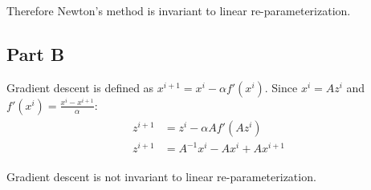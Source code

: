 \documentclass[11pt]{article}
\begin{document}
Therefore Newton's method is invariant to linear re-parameterization. 

\subsection*{Part B}
Gradient descent is defined as $x^{i+1}=x^{i}-\alpha f'(x^{i})$. Since $x^{i}=Az^{i}$ and 
$f'(x^{i})=\frac{x^{i}-x^{i+1}}{\alpha}$:
\begin{align}
	\begin{split}
		z^{i+1} &= z^{i}-\alpha Af'(Az^{i}) \\
		z^{i+1} &= A^{-1}x^{i} - Ax^{i} + Ax^{i+1}
	\end{split}
\end{align}

Gradient descent is not invariant to linear re-parameterization.



\end{document}
